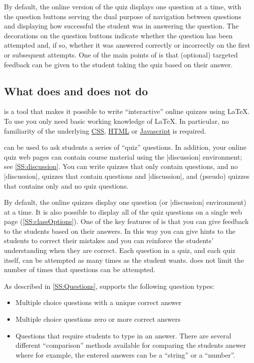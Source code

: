 \documentclass[svgnames]{article}
\newcommand{\HTML}{\href{https://www.w3schools.com/html/html_intro.asp}{HTML}\xspace}
\newcommand\CSS{\href{https://www.w3schools.com/css}{CSS}\xspace}
\newcommand\Javascript{\href{https://www.w3schools.com/Js/}{Javascript}\xspace}
\begin{document}
      By default, the online version of the quiz displays one question at
      a time, with the question buttons serving the dual purpose of
      navigation between questions and displaying how successful the
      student was in answering the question. The decorations on the
      question buttons indicate whether the question has been attempted
      and, if so, whether it was answered correctly or incorrectly on the
      first or subsequent attempts. One of the main points of \WebQuiz is
      that (optional) targeted feedback can be given to the student taking
      the quiz based on their answer.

  \subsection{What \WebQuiz does and does not do}

      \WebQuiz is a tool that makes it possible to write ``interactive''
      online quizzes using \LaTeX{}. To use \WebQuiz you only need
      basic working knowledge of \LaTeX{}. In particular, no familiarity
      of the underlying \CSS, \HTML or \Javascript is required.

      \WebQuiz can be used to ask students a series of ``quiz''
      questions. In addition, your online quiz web pages can contain
      course material using the \WebQuiz \LatexCode|discussion|
      environment; see \autoref{SS:discussion}. You can write \WebQuiz
      quizzes that only contain questions, and no
      \LatexCode|discussion|, quizzes that contain questions and
      \LatexCode|discussion|, and (pseudo) quizzes that contains only
       and no quiz questions.

      By default, the online quizzes display one question (or
      \LatexCode|discussion| environment) at a time.  It is also possible
      to display all of the quiz questions on a single web page
      (\autoref{SS:classOptions}). One of the key features of \WebQuiz is
      that you can give feedback to the students based on their answers.
      In this way you can give hints to the students to correct their
      mistakes and you can reinforce the students' understanding when they
      are correct. Each question in a quiz, and each quiz itself, can be
      attempted as many times as the student wants. \WebQuiz does not
      limit the number of times that questions can be attempted.

      As described in \autoref{SS:Questions}, \WebQuiz  supports the following question types:
      \begin{itemize}
        \item Multiple choice questions with a unique correct answer
        \item Multiple choice questions zero or more correct answers
        \item Questions that require students to type in an answer. There
        are several different ``comparison'' methods available for
        comparing the students answer where
        for example, the entered answers can be a ``string'' or a ``number''.
      \end{itemize}
\end{document}
